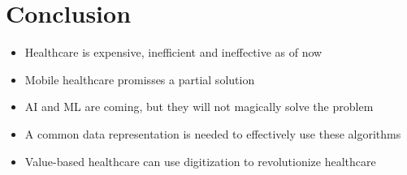 \documentclass[xcolor=dvipsnames, aspectratio=1610]{beamer}
\begin{document}
\section{Conclusion}%
\label{sec:conclusion}

\begin{frame}{\secname}
    \begin{itemize}[<+->]
        \item Healthcare is expensive, inefficient and ineffective as of now
        \item Mobile healthcare promisses a partial solution
        \item AI and ML are coming, but they will not magically solve the problem
        \item A common data representation is needed to effectively use these algorithms
        \item Value-based healthcare can use digitization to revolutionize healthcare
    \end{itemize}
\end{frame}

\end{document}
